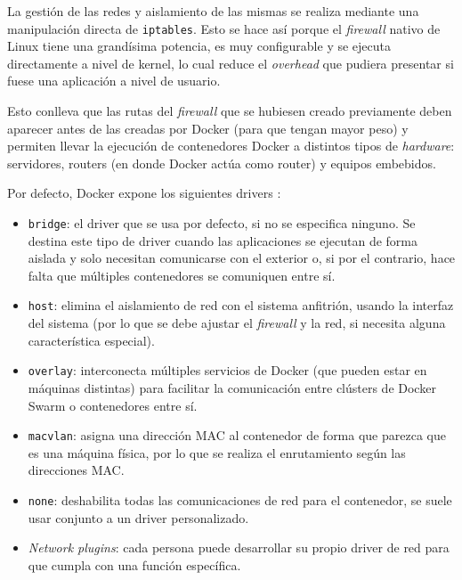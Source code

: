 La gestión de las redes y aislamiento de las mismas se realiza mediante una
manipulación directa de \texttt{iptables}. Esto se hace así porque el \textit{firewall}
nativo de Linux tiene una grandísima potencia, es muy configurable y se ejecuta
directamente a nivel de kernel, lo cual reduce el \textit{overhead} que pudiera
presentar si fuese una aplicación a nivel de usuario.

Esto conlleva que las rutas del \textit{firewall} que se hubiesen creado previamente
deben aparecer antes de las creadas por Docker (para que tengan mayor peso) y 
permiten llevar la ejecución de contenedores Docker a distintos tipos de \textit{hardware}:
servidores, routers (en donde Docker actúa como router) y equipos embebidos.

Por defecto, Docker expone los siguientes drivers \cite{NetworkingOverview2021}:

\begin{itemize}
    \item \texttt{bridge}: el driver que se usa por defecto, si no se especifica 
          ninguno. Se destina este tipo de driver cuando las aplicaciones se
          ejecutan de forma aislada y solo necesitan comunicarse con el exterior o,
          si por el contrario, hace falta que múltiples contenedores se comuniquen
          entre sí.

    \item \texttt{host}: elimina el aislamiento de red con el sistema anfitrión,
          usando la interfaz del sistema (por lo que se debe ajustar
          el \textit{firewall} y la red, si necesita alguna característica especial).
        
    \item \texttt{overlay}: interconecta múltiples servicios de Docker (que pueden
          estar en máquinas distintas) para facilitar la comunicación entre clústers
          de Docker Swarm o contenedores entre sí.

    \item \texttt{macvlan}: asigna una dirección MAC al contenedor de forma que parezca
          que es una máquina física, por lo que se realiza el enrutamiento según las
          direcciones MAC.

    \item \texttt{none}: deshabilita todas las comunicaciones de red para el
          contenedor, se suele usar conjunto a un driver personalizado.

    \item \textit{Network plugins}: cada persona puede desarrollar su propio
          driver de red para que cumpla con una función específica.
\end{itemize}
